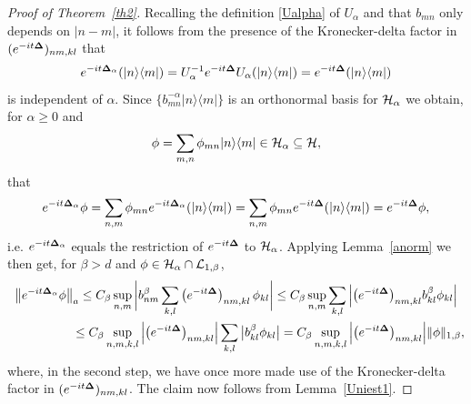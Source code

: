 \documentclass[pdftex]{sigma}
\begin{document}
\begin{proof}[Proof of Theorem~\ref{th2}]
Recalling the def\/inition \eqref{Ualpha} of $U_\alpha$ and that
$b_{mn}$ only depends on $|n-m|$, it follows from the presence of the
Kronecker-delta factor in $(e^{-it{\bf{\Delta}}})_{nm,kl}$ that
\[
e^{-it{\bf{\Delta}}_\alpha}(|n\rangle\langle m|) = U_\alpha^{-1}
e^{-it{\bf{\Delta}}}U_\alpha(|n\rangle\langle m|) = e^{-it{\bf{\Delta}}}(|n\rangle\langle m|)
\]
is independent of $\alpha$. Since
$\{b_{mn}^{-\alpha}|n\rangle\langle m|\}$ is an orthonormal basis
for ${\cal H}_\alpha$ we obtain, for $\alpha\geq 0$ and
\[
\phi =
\sum_{m,n}\phi_{mn}|n\rangle\langle m| \in {\cal H}_\alpha\subseteq
{\cal H} ,
\]
that
\[
e^{-it{\bf{\Delta}}_\alpha}\phi =
\sum_{n,m}\phi_{mn}e^{-it{\bf{\Delta}}_\alpha}(|n\rangle\langle m|) =
\sum_{n,m}\phi_{mn}e^{-it{\bf{\Delta}}}(|n\rangle\langle m|) = e^{-it{\bf{\Delta}}}\phi ,
\]
i.e. $e^{-it{\bf{\Delta}}_\alpha}$ equals the restriction of $e^{-it{\bf{\Delta}}}$
to ${\cal H}_\alpha$.
Applying  Lemma~\ref{anorm} we then get, for $\beta>d$ and
$\phi\in {\cal H}_\alpha\cap {\cal L}_{1,\beta}$,
\begin{gather*}
\big\Vert e^{-it{\bf{\Delta}}_\alpha}\phi\big\Vert_a
 \leq
 C_\beta \sup_{n,m}\bigg|b_{nm}^{\beta}
\sum_{k,l}\big(e^{-it{\bf{\Delta}}}\big)_{nm,kl}\,\phi_{kl}\bigg|
 \leq C_\beta \sup_{n,m}\sum_{k,l}\Big|
\big(e^{-it{\bf{\Delta}}}\big)_{nm,kl} b_{kl}^{\beta} \phi_{kl}\Big|\\
\phantom{\big\Vert e^{-it{\bf{\Delta}}_\alpha}\phi\big\Vert_a}{}
\leq
C_\beta \sup_{n,m,k,l}\Big|\big(e^{-it{\bf{\Delta}}}\big)_{nm,kl}\Big| \sum_{k,l}\big|b_{kl}^{\beta} \phi_{kl}\big|
= C_\beta \sup_{n,m,k,l}\Big|\big(e^{-it{\bf{\Delta}}}\big)_{nm,kl}\Big|
\Vert\phi\Vert_{1,\beta} ,
\end{gather*}
where, in the second step, we have once more made use of the
Kronecker-delta factor in $(e^{-it{\bf{\Delta}}})_{nm,kl}$.
The claim now follows from Lemma~\ref{Uniest1}.
\end{proof}
\end{document}

